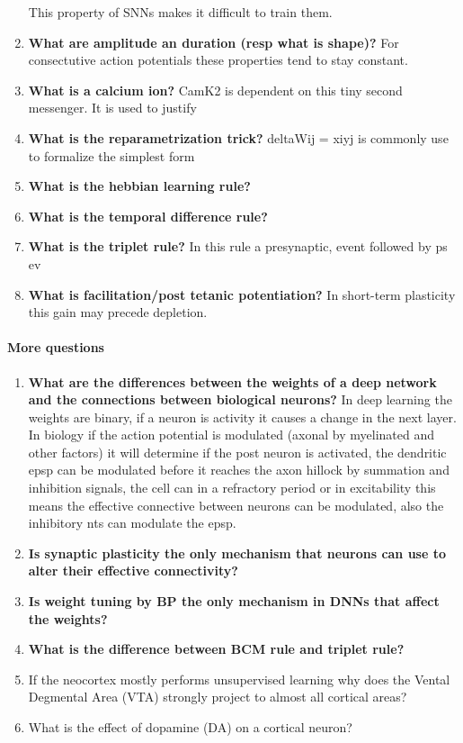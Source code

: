 \documentclass[main]{subfiles}
\begin{document}
\begin{enumerate}
    This property of SNNs makes it difficult to train them.
    \item \textbf{What are amplitude an duration (resp what is shape)?}
    For consectutive action potentials these properties tend to stay constant.
    \item \textbf{What is a calcium ion?}
    CamK2 is dependent on this tiny second messenger.
    It is used to justify
    \item \textbf{What is the reparametrization trick?}
    deltaWij = xiyj is commonly use to formalize the simplest form
    \item \textbf{What is the hebbian learning rule?}
    \item \textbf{What is the temporal difference rule?}
    \item \textbf{What is the triplet rule?}
    In this rule a presynaptic, event followed by ps ev
    \item \textbf{What is facilitation/post tetanic potentiation?}
    In short-term plasticity this gain may precede depletion.
\end{enumerate}

\paragraph{More questions}
\begin{enumerate}
    \item \textbf{What are the differences between the weights of a deep network and the connections between biological neurons?} 
    In deep learning the weights are binary, if a neuron is activity it causes a change in the next layer.
    In biology if the action potential is modulated (axonal by myelinated and other factors) it will determine if the post neuron is activated, the dendritic epsp can be modulated before it reaches the axon hillock by summation and inhibition signals, the cell can in a refractory period or in excitability this means the effective connective between neurons can be modulated, also the inhibitory nts can modulate the epsp.
    \item \textbf{Is synaptic plasticity the only mechanism that neurons can use to alter their effective connectivity?}
    \item \textbf{Is weight tuning by BP the only mechanism in DNNs that affect the weights?}
    \item \textbf{What is the difference between BCM rule and triplet rule?}
    \item If the neocortex mostly performs unsupervised learning why does the Vental Degmental Area (VTA) strongly project to almost all cortical areas?
    \item What is the effect of dopamine (DA) on a cortical neuron?
    
    
\end{enumerate}
\end{document}
